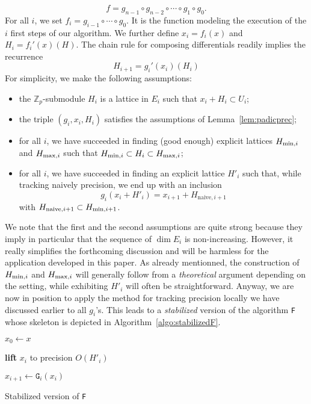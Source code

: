 \documentclass{jT}
\numberwithin{equation}{section}
\theoremstyle{definition}
\newcommand{\Z}{\mathbb Z}
\newcommand{\Zp}{\Z_p}
\renewcommand{\min}{\text{\rm min}}
\renewcommand{\max}{\text{\rm max}}
\begin{document}
$$f = g_{n-1} \circ g_{n-2} \circ \cdots \circ g_1 \circ g_0.$$
For all $i$, we set $f_i = g_{i-1} \circ \cdots \circ g_0$. It is the 
function modeling the execution of the $i$ first steps of our algorithm. 
We further define $x_i = f_i(x)$ and $H_i = f_i'(x)(H)$. The chain rule 
for composing differentials readily implies the recurrence
\begin{equation}
\label{eq:giprime}
H_{i+1} = g_i'(x_i)(H_i)
\end{equation}
For simplicity, we make the following assumptions:
\begin{itemize}
\item the $\Zp$-submodule $H_i$ is a lattice in $E_i$ such that $x_i + 
H_i \subset U_i$;
\item the triple $(g_i, x_i, H_i)$ satisfies the assumptions of 
Lemma~\ref{lem:padicprec};
\item for all $i$, we have succeeded in finding (good enough) explicit 
lattices $H_{\min,i}$ and $H_{\max,i}$ such that $H_{\min,i} \subset H_i 
\subset H_{\max,i}$;
\item for all $i$, we have succeeded in finding an explicit lattice
$H'_i$ such that, while tracking naively precision, we end up with an
inclusion
$$g_i(x_i + H'_i) = x_{i+1} + H_{\text{naive},i+1}$$
with $H_{\text{naive},i+1} \subset H_{\min,i+1}$.
\end{itemize}
We note that the first and the second assumptions are quite strong 
because they imply in particular that the sequence of $\dim E_i$ is 
non-increasing. However, it really simplifies the forthcoming discussion 
and will be harmless for the application developed in this paper. As
already mentionned, the construction of $H_{\min,i}$ and $H_{\max,i}$
will generally follow from a \emph{theoretical} argument depending on
the setting, while exhibiting $H'_i$ will often be straightforward.
Anyway, we are now in position to apply the method for 
tracking precision locally we have discussed earlier to all $g_i$'s. 
This leads to a \emph{stabilized} version of the algorithm \texttt{F} 
whose skeleton is depicted in Algorithm~\ref{algo:stabilizedF}.

\begin{algorithm}
  \Output{$f(x)$ given at precision $O(H_{\max,n})$}
  
  \BlankLine

  $x_0 \leftarrow x$

    {\textbf{lift} $x_i$ to precision $O(H'_i)$

     $x_{i+1} \leftarrow \texttt{G}_i(x_i)$}

  \Return{$x_n + O(H_{\max,n})$}
\caption{Stabilized version of \texttt{F}}
\label{algo:stabilizedF}
\end{algorithm}
\end{document}
